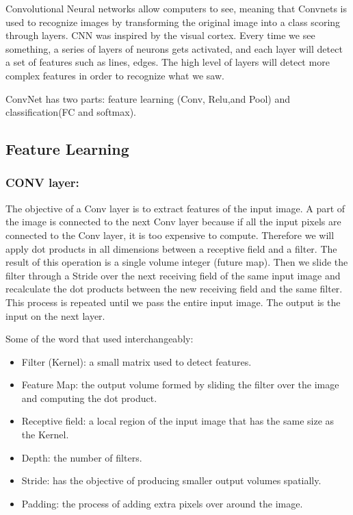 \documentclass[12pt]{report}
\begin{document}
Convolutional Neural networks allow computers to see, 
meaning that Convnets is used to recognize images by 
transforming the original image into a class scoring through layers.
CNN was inspired by the visual cortex.
Every time we see something, a series of layers of neurons gets activated, 
and each layer will detect a set of features such as lines, edges. 
The high level of layers will detect more complex features in order to
 recognize what we saw.

ConvNet has two parts: feature learning (Conv, Relu,and Pool) and 
classification(FC and softmax).

\subsection{Feature Learning}
\subsubsection{CONV layer:}
The objective of a Conv layer is to extract features of the input image.
A part of the image is connected to the next Conv layer because if all the 
input pixels are connected to the Conv layer, it is too expensive to compute. 
Therefore we will apply dot products in all dimensions between a receptive 
field and a filter. The result of this operation is a single volume integer 
(future map).
Then we slide the filter through a Stride over the next receiving field of 
the same input image and recalculate the dot products between the new receiving
field and the same filter. This process is repeated until we pass the entire 
input image. The output is the input on the next layer.

Some of the word that used interchangeably:
\begin{itemize}
    \item Filter (Kernel): a small matrix used to detect features.
    \item Feature Map: the output volume formed by sliding the filter 
    over the image and computing the dot product.
    \item Receptive field: a local region of the input image that has 
    the same size as the Kernel.
    \item Depth: the number of filters.
    \item Stride: has the objective of producing smaller output volumes spatially.
    \item Padding: the process of adding extra pixels over around the image.
\end{itemize}
\end{document}
